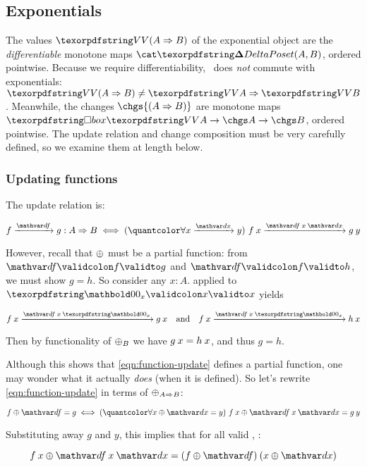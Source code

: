 

\subsection{Exponentials}
\label{sec:CP-exponentials}

The values $\vals{(\expO A B)}$ of the exponential object are the
\emph{differentiable} monotone maps $\CP(A, B)$, ordered pointwise. Because we
require differentiability, \valfn\ does \emph{not} commute with exponentials:
$\vals{(\expO A B)} \ne \expO{\vals A}{\vals B}$.
%
Meanwhile, the changes $\chgs{(\expO A B)}$ are monotone maps $\iso{\vals A}
\to \chgs A \to \chgs B$, ordered pointwise. The update relation and change
composition must be very carefully defined, so we examine them at length below.

\subsubsection{Updating functions}

The update relation is:

\nopagebreak[2]
\begin{equation}\label{eqn:function-update}
  \vld{\df}{f}{g} : \expO A B
  \iff \fa{\vld\dx x y} \vld{\df\<x\<\dx} {f\<x} {g\<y}
\end{equation}

\noindent However, recall that $\mathbin{\oplus}$ must be a partial function: from
$\valid\df f g$ and $\valid\df f h$, we must show $g = h$. So consider any $x :
A$.  applied to $\valid{\zero_x} x x$ yields

\nopagebreak[2]
\[ \vld{\df \<x \<\zero_x}{f \<x}{g\<x}
\quad\text{and}\quad \vld{\df \<x \<\zero_x}{f \<x}{h\<x} \]

\noindent
Then by functionality of ${\mathbin{\oplus}}_B$ we have $g\<x = h\<x$, and thus $g = h$.

Although this shows that \cref{eqn:function-update} defines a partial function,
one may wonder what it actually \emph{does} (when it is defined). So let's
rewrite \cref{eqn:function-update} in terms of $\mathbin{\oplus}_{A \Rightarrow B}$:

\nopagebreak[2]
\[ f \upd \df = g \iff \fa{x \upd \dx = y} f\<x \upd \df\<x\<\dx = g\<y \]

\noindent Substituting away $g$ and $y$, this implies that for all valid
\dx, \df:

\nopagebreak[2]
\[
f\<x \upd \df\<x\<\dx = (f \upd \df) \<(x \upd \dx)
\]

